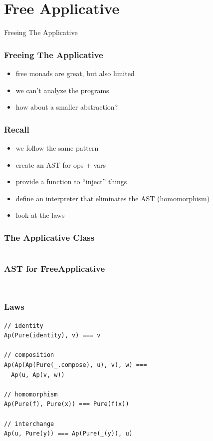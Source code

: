 \documentclass{beamer}
\newcommand{\recipe}{%
  \begin{itemize}
  \item create an AST for ops + vars
  \item provide a function to ``inject'' things
  \item define an interpreter that eliminates the AST (homomorphism)
  \item look at the laws
  \end{itemize}
}
\begin{document}
\section{Free Applicative}\label{sec:free-applicative}
\begin{frame}
  \begin{center}
    \Huge
    Freeing The Applicative
  \end{center}
\end{frame}

\begin{frame}
  \frametitle{Freeing The Applicative}
  \begin{itemize}
  \item free monads are great, but also limited
  \item we can't analyze the programs
  \item how about a smaller abstraction?
  \end{itemize}
\end{frame}

\begin{frame}
  \frametitle{Recall}
  \begin{itemize}
  \item we follow the same pattern
  \end{itemize}
  \recipe{}
\end{frame}

\begin{frame}[fragile]
  \frametitle{The Applicative Class}
  \inputminted{scala}{snippets/applicative-typeclass.scala}
\end{frame}

\begin{frame}[fragile]
  \frametitle{AST for FreeApplicative}
    \inputminted{scala}{snippets/free-applicative.scala}
  \begin{verbatim}
\end{verbatim}
\end{frame}

\begin{frame}[fragile]
  \frametitle{Laws}
\begin{verbatim}
// identity
Ap(Pure(identity), v) === v

// composition
Ap(Ap(Ap(Pure(_.compose), u), v), w) ===
  Ap(u, Ap(v, w))

// homomorphism
Ap(Pure(f), Pure(x)) === Pure(f(x))

// interchange
Ap(u, Pure(y)) === Ap(Pure(_(y)), u)
\end{verbatim}
\end{frame}
\end{document}
